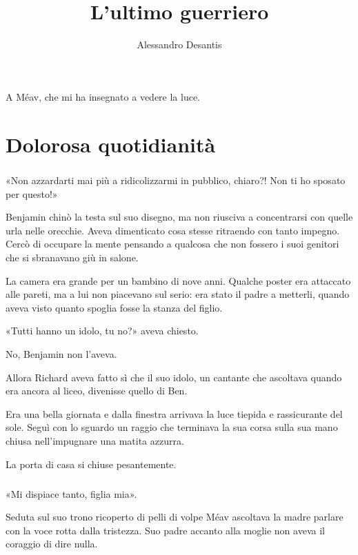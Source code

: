 \documentclass[a4paper,12pt]{book}
\title{L'ultimo guerriero}
\author{Alessandro Desantis}
\date{}
\newenvironment{dedication}
{
    \thispagestyle{empty}
    \begin{flushright}
}%
{
    \end{flushright}
}
\begin{document}
\maketitle

\begin{dedication}
A Méav, che mi ha insegnato a vedere la luce.
\end{dedication}

\chapter{Dolorosa quotidianità}


\paragraph{}
«Non azzardarti mai più a ridicolizzarmi in pubblico, chiaro?! Non ti ho
sposato per questo!»

Benjamin chinò la testa sul suo disegno, ma non riusciva a concentrarsi con
quelle urla nelle orecchie. Aveva dimenticato cosa stesse ritraendo con tanto
impegno. Cercò di occupare la mente pensando a qualcosa che non fossero i suoi
genitori che si sbranavano giù in salone.

La camera era grande per un bambino di nove anni. Qualche poster era attaccato
alle pareti, ma a lui non piacevano sul serio: era stato il padre a metterli,
quando aveva visto quanto spoglia fosse la stanza del figlio.

«Tutti hanno un idolo, tu no?» aveva chiesto.

No, Benjamin non l’aveva.

Allora Richard aveva fatto sì che il suo idolo, un cantante che ascoltava
quando era ancora al liceo, divenisse quello di Ben.

Era una bella giornata e dalla finestra arrivava la luce tiepida e rassicurante
del sole. Seguì con lo sguardo un raggio che terminava la sua corsa sulla sua
mano chiusa nell’impugnare una matita azzurra.

La porta di casa si chiuse pesantemente.

\paragraph{}
«Mi dispiace tanto, figlia mia».

Seduta sul suo trono ricoperto di pelli di volpe Méav ascoltava la madre
parlare con la voce rotta dalla tristezza. Suo padre accanto alla moglie non
aveva il coraggio di dire nulla.
\end{document}
